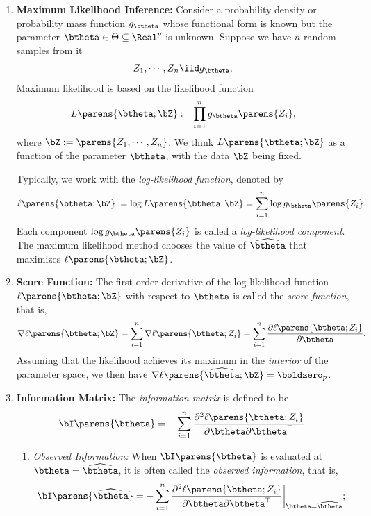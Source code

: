 \documentclass[12pt]{article}
\begin{document}
\begin{enumerate}[label=\textbf{\arabic*.}]
	\item \textbf{Maximum Likelihood Inference:} Consider a probability density or probability mass function $g_{\btheta}$ whose functional form is known but the parameter $\btheta \in \Theta \subseteq \Real^p$ is unknown. Suppose we have $n$ random samples from it 
	\begin{align}
		Z_1, \cdots, Z_n \iid g_{\btheta}, 
	\end{align}
	Maximum likelihood is based on the likelihood function
	\begin{align}
		L \parens{\btheta; \bZ} := \prod_{i=1}^{n} g_{\btheta} \parens{Z_i}, 
	\end{align}
	where $\bZ := \parens{Z_1, \cdots, Z_n}$. We think $L \parens{\btheta; \bZ}$ as a function of the parameter $\btheta$, with the data $\bZ$ being fixed. 
	
	Typically, we work with the \textit{log-likelihood function}, denoted by
	\begin{align}
		\ell \parens{\btheta; \bZ} := \log L \parens{\btheta; \bZ} = \sum_{i=1}^n \log g_{\btheta} \parens{Z_i}. 
	\end{align}
	Each component $\log g_{\btheta} \parens{Z_i}$ is called a \textit{log-likelihood component}. The maximum likelihood method chooses the value of $\widehat{\btheta}$ that maximizes $\ell \parens{\btheta; \bZ}$. 
	
	\item \textbf{Score Function:} The first-order derivative of the log-likelihood function $\ell \parens{\btheta; \bZ}$ with respect to $\btheta$ is called the \textit{score function}, that is, 
	\begin{align}
		\nabla \ell \parens{\btheta; \bZ} = \sum_{i=1}^n \nabla \ell \parens{\btheta; Z_i} = \sum_{i=1}^n \frac{\partial \ell \parens{\btheta; Z_i}}{\partial \btheta}. 
	\end{align}
	Assuming that the likelihood achieves its maximum in the \textit{interior} of the parameter space, we then have $\nabla \ell \parens{\widehat{\btheta}; \bZ} = \boldzero_p$. 
	
	\item \textbf{Information Matrix:} The \textit{information matrix} is defined to be
	\begin{align}
		\bI \parens{\btheta} = - \sum_{i=1}^n \frac{\partial ^2 \ell \parens{\btheta; Z_i} }{ \partial \btheta \partial \btheta^\top}. 
	\end{align}
	
	\begin{enumerate}
		\item \textit{Observed Information:} When $\bI \parens{\btheta}$ is evaluated at $\btheta = \widehat{\btheta} $, it is often called the \textit{observed information}, that is, 
		\begin{equation}
			\bI \parens{\widehat{\btheta}} = - \sum_{i=1}^n \frac{\partial ^2 \ell \parens{\btheta; Z_i} }{\partial \btheta \partial \btheta^\top}\bigg\rvert_{\btheta = \widehat{\btheta}}; 
		\end{equation}
		

\end{enumerate}
\end{enumerate}
\end{document}
